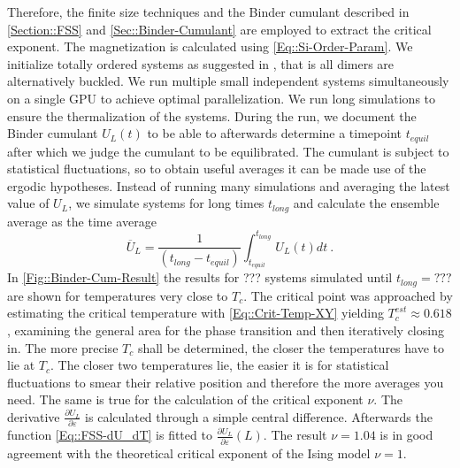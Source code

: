 	Therefore, the finite size techniques and the Binder cumulant described in \autoref{Section::FSS} and \autoref{Sec::Binder-Cumulant} are employed to extract the critical exponent. The magnetization is calculated using \autoref{Eq::Si-Order-Param}. We initialize totally ordered systems as suggested in \cite{binder2022monte}, that is all dimers are alternatively buckled. We run multiple small independent systems simultaneously on a single GPU to achieve optimal parallelization. We run long simulations to ensure the thermalization of the systems. During the run, we document the Binder cumulant $U_L(t)$ to be able to afterwards determine a timepoint $t_{equil}$ after which we judge the cumulant to be equilibrated. The cumulant is subject to statistical fluctuations, so to obtain useful averages it can be made use of the ergodic hypotheses. Instead of running many simulations and averaging the latest value of $U_L$, we simulate systems for long times $t_{long}$ and calculate the ensemble average as the time average
	\begin{equation} \label{Eq::Mean-Ergodic-Hypo}
		\overline{U}_L =	\frac{1}{(t_{long} - t_{equil})} \int_{t_{equil}}^{t_{long}} U_L(t) dt~.
	\end{equation}
	In \autoref{Fig::Binder-Cum-Result} the results for ??? systems simulated until $t_{long} = ???$ are shown for temperatures very close to $T_c$. The critical point was approached by estimating the critical temperature with \autoref{Eq::Crit-Temp-XY} yielding $T_c^{est} \approx 0.618$, examining the general area for the phase transition and then iteratively closing in. The more precise $T_c$ shall be determined, the closer the temperatures have to lie at $T_c$. The closer two temperatures lie, the easier it is for statistical fluctuations to smear their relative position and therefore the more averages you need. The same is true for the calculation of the critical exponent $\nu$. The derivative $\tfrac{\partial U_L}{\partial \varepsilon}$ is calculated through a simple central difference. Afterwards the function \autoref{Eq::FSS-dU_dT} is fitted to $\tfrac{\partial U_L}{\partial \varepsilon} (L)$. The result $\nu =	1.04$ is in good agreement with the theoretical critical exponent of the Ising model $\nu =	1$.
